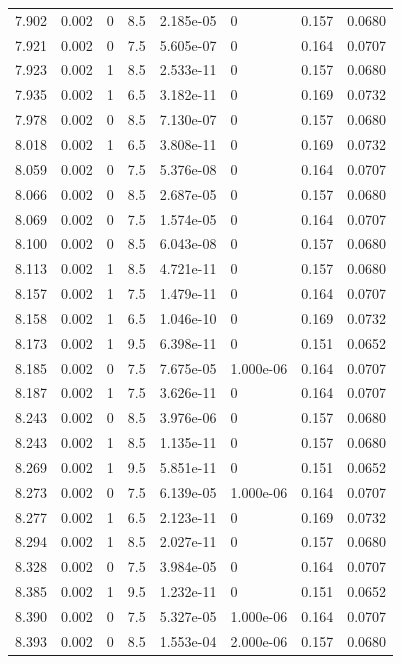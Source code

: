 \documentclass[preview]{standalone}
\begin{document}
{{{{{{{{{\begin{tabular}{L{1.2cm}C{1.2cm} C{0.3cm}C{0.5cm} C{1.4cm}C{1.4cm} C{1.4cm}C{1.4cm}}
  7.902  &  0.002  & 0     & 8.5 &  2.185e-05  & 0  & 0.157 &  0.0680   \\ 
  7.921  &  0.002  & 0     & 7.5 &  5.605e-07  & 0  & 0.164 &  0.0707   \\ 
  7.923  &  0.002  & 1     & 8.5 &  2.533e-11  & 0  & 0.157 &  0.0680   \\ 
  7.935  &  0.002  & 1     & 6.5 &  3.182e-11  & 0  & 0.169 &  0.0732   \\ 
  7.978  &  0.002  & 0     & 8.5 &  7.130e-07  & 0  & 0.157 &  0.0680   \\ 
  8.018  &  0.002  & 1     & 6.5 &  3.808e-11  & 0  & 0.169 &  0.0732   \\ 
  8.059  &  0.002  & 0     & 7.5 &  5.376e-08  & 0  & 0.164 &  0.0707   \\ 
  8.066  &  0.002  & 0     & 8.5 &  2.687e-05  & 0  & 0.157 &  0.0680   \\ 
  8.069  &  0.002  & 0     & 7.5 &  1.574e-05  & 0  & 0.164 &  0.0707   \\ 
  8.100  &  0.002  & 0     & 8.5 &  6.043e-08  & 0  & 0.157 &  0.0680   \\ 
  8.113  &  0.002  & 1     & 8.5 &  4.721e-11  & 0  & 0.157 &  0.0680   \\ 
  8.157  &  0.002  & 1     & 7.5 &  1.479e-11  & 0  & 0.164 &  0.0707   \\ 
  8.158  &  0.002  & 1     & 6.5 &  1.046e-10  & 0  & 0.169 &  0.0732   \\ 
  8.173  &  0.002  & 1     & 9.5 &  6.398e-11  & 0  & 0.151 &  0.0652   \\ 
  8.185  &  0.002  & 0     & 7.5 &  7.675e-05  & 1.000e-06  & 0.164 &  0.0707   \\ 
  8.187  &  0.002  & 1     & 7.5 &  3.626e-11  & 0  & 0.164 &  0.0707   \\ 
  8.243  &  0.002  & 0     & 8.5 &  3.976e-06  & 0  & 0.157 &  0.0680   \\ 
  8.243  &  0.002  & 1     & 8.5 &  1.135e-11  & 0  & 0.157 &  0.0680   \\ 
  8.269  &  0.002  & 1     & 9.5 &  5.851e-11  & 0  & 0.151 &  0.0652   \\ 
  8.273  &  0.002  & 0     & 7.5 &  6.139e-05  & 1.000e-06  & 0.164 &  0.0707   \\ 
  8.277  &  0.002  & 1     & 6.5 &  2.123e-11  & 0  & 0.169 &  0.0732   \\ 
  8.294  &  0.002  & 1     & 8.5 &  2.027e-11  & 0  & 0.157 &  0.0680   \\ 
  8.328  &  0.002  & 0     & 7.5 &  3.984e-05  & 0  & 0.164 &  0.0707   \\ 
  8.385  &  0.002  & 1     & 9.5 &  1.232e-11  & 0  & 0.151 &  0.0652   \\ 
  8.390  &  0.002  & 0     & 7.5 &  5.327e-05  & 1.000e-06  & 0.164 &  0.0707   \\ 
  8.393  &  0.002  & 0     & 8.5 &  1.553e-04  & 2.000e-06  & 0.157 &  0.0680   \\ 
\hline 
\end{tabular} 

}}}}}}}}}
\end{document}
